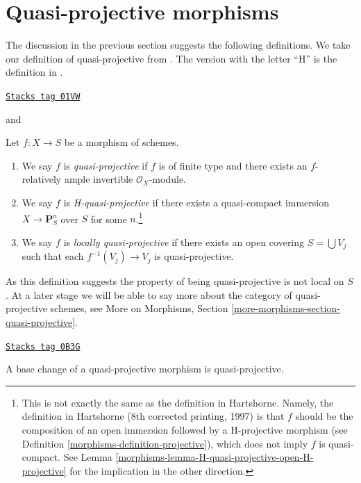 \section{Quasi-projective morphisms}
\label{morphisms-section-quasi-projective}
The discussion in the previous section suggests the following definitions.
We take our definition of quasi-projective from \cite{EGA}. The version
with the letter ``H'' is the definition in \cite{H}.

\begin{definition}
\label{morphisms-definition-quasi-projective}
\href{https://stacks.math.columbia.edu/tag/01VW}{\texttt{Stacks tag 01VW}}

\begin{reference}
\cite[II, Definition 5.3.1]{EGA} and \cite[page 103]{H}
\end{reference}
Let $f : X \to S$ be a morphism of schemes.
\begin{enumerate}
\item We say $f$ is {\it quasi-projective} if $f$ is of finite type
and there exists an $f$-relatively ample invertible $\mathcal{O}_X$-module.
\item We say $f$ is {\it H-quasi-projective} if there exists
a quasi-compact immersion $X \to \mathbf{P}^n_S$ over $S$ for some
$n$.\footnote{This is not exactly the same as the definition in Hartshorne.
Namely, the definition in Hartshorne (8th corrected printing, 1997) is that
$f$ should be the composition of an open immersion followed by a H-projective
morphism (see Definition \ref{morphisms-definition-projective}), which does not imply
$f$ is quasi-compact. See
Lemma \ref{morphisms-lemma-H-quasi-projective-open-H-projective} for
the implication in the other direction.}
\item We say $f$ is {\it locally quasi-projective} if there exists
an open covering $S = \bigcup V_j$ such that each $f^{-1}(V_j) \to V_j$
is quasi-projective.
\end{enumerate}
\end{definition}

As this definition suggests the property of being quasi-projective
is not local on $S$. At a later stage we will be able to say more
about the category of quasi-projective schemes, see
More on Morphisms, Section \ref{more-morphisms-section-quasi-projective}.

\begin{lemma}
\label{morphisms-lemma-base-change-quasi-projective}
\href{https://stacks.math.columbia.edu/tag/0B3G}{\texttt{Stacks tag 0B3G}}

A base change of a quasi-projective morphism is quasi-projective.
\end{lemma}

